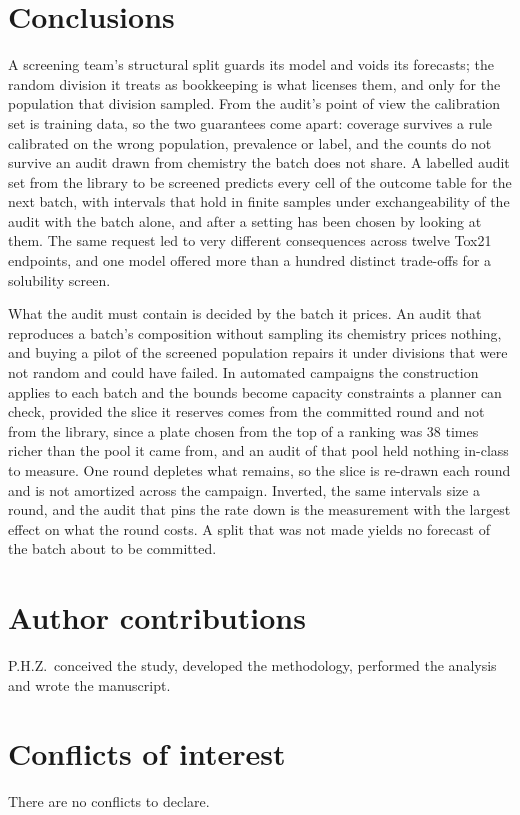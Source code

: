 \documentclass[twocolumn,10pt]{article}
\begin{document}
\section{Conclusions}

A screening team's structural split guards its model and voids its forecasts; the random
division it treats as bookkeeping is what licenses them, and only for the population that
division sampled. From the audit's point of view the calibration set is training data, so the
two guarantees come apart: coverage survives a rule calibrated on the wrong population,
prevalence or label, and the counts do not survive an audit drawn from chemistry the batch does
not share. A labelled audit set from the library to be screened predicts every cell of the
outcome table for the next batch, with intervals that hold in finite samples under
exchangeability of the audit with the batch alone, and after a setting has been chosen by
looking at them. The same request led to very different consequences across twelve Tox21
endpoints, and one model offered more than a hundred distinct trade-offs for a solubility
screen.

What the audit must contain is decided by the batch it prices. An audit that reproduces a
batch's composition without sampling its chemistry prices nothing, and buying a pilot of the
screened population repairs it under divisions that were not random and could have failed. In
automated campaigns the construction applies to each batch and the bounds become capacity
constraints a planner can check, provided the slice it reserves comes from the committed
round and not from the library, since a plate chosen from the top of a ranking was 38 times
richer than the pool it came from, and an audit of that pool held nothing in-class to measure.
One round depletes what remains, so the slice is re-drawn each round and is not amortized across the campaign. Inverted, the same intervals size a round, and the audit that pins the
rate down is the measurement with the largest effect on what the round costs. A split that was not made yields no forecast of the batch about to be committed.

\section*{Author contributions}
P.H.Z.\ conceived the study, developed the methodology, performed the analysis and wrote the manuscript.

\section*{Conflicts of interest}
There are no conflicts to declare.
\end{document}
